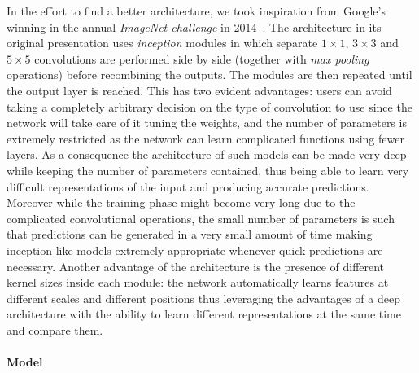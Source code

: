 In the effort to find a better architecture, we took inspiration from Google's winning \cnn in the annual \href{https://image-net.org/challenges/LSVRC/}{\emph{ImageNet challenge}} in 2014~\cite{Szegedy:2015:GoingDeeperConvolutions, Szegedy:2016:RethinkingInceptionArchitecture, Szegedy:2016:Inceptionv4InceptionresnetImpact}.
The architecture in its original presentation uses \emph{inception} modules in which separate $1 \times 1$, $3 \times 3$ and  $5 \times 5$ convolutions are performed side by side (together with \emph{max pooling} operations) before recombining the outputs.
The modules are then repeated until the output layer is reached.
This has two evident advantages: users can avoid taking a completely arbitrary decision on the type of convolution to use since the network will take care of it tuning the weights, and the number of parameters is extremely restricted as the network can learn complicated functions using fewer layers.
As a consequence the architecture of such models can be made very deep while keeping the number of parameters contained, thus being able to learn very difficult representations of the input and producing accurate predictions.
Moreover while the training phase might become very long due to the complicated convolutional operations, the small number of parameters is such that predictions can be generated in a very small amount of time making inception-like models extremely appropriate whenever quick predictions are necessary.
Another advantage of the architecture is the presence of different kernel sizes inside each module: the network automatically learns features at different scales and different positions thus leveraging the advantages of a deep architecture with the ability to learn different representations at the same time and compare them.


\paragraph{Model}

